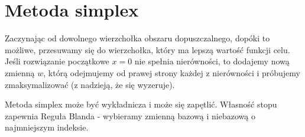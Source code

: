 \section{Metoda simplex}
Zaczynając od dowolnego wierzchołka obszaru dopuszczalnego, dopóki to możliwe, przesuwamy się do wierzchołka, który ma lepszą wartość funkcji celu. Jeśli rozwiązanie początkowe \( x = 0 \) nie spełnia nierówności, to dodajemy nową zmienną \( w \), którą odejmujemy od prawej strony każdej z nierówności i próbujemy zmaksymalizować (z nadzieją, że się wyzeruje).
\begin{warning}
	Metoda simplex może być wykładnicza i może się zapętlić. Własność stopu zapewnia Reguła Blanda - wybieramy zmienną bazową i niebazową o najmniejszym indeksie.
\end{warning}